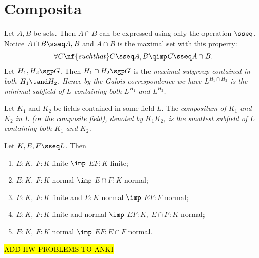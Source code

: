 \documentclass[a4paper]{article}
\begin{document}
\section{Composita}
\begin{tremark}
  Let \( A,B \) be sets. Then \( A\cap B \) can be expressed using only the operation \( \sseq \).
  Notice \( A\cap B \sseq A,B \) and \( A\cap B \) is the maximal set with this property: \begin{align*}
    \forall C \nf{ such that } C\sseq A,B \qimp C\sseq A\cap B.
  \end{align*}
  Let \( H_1,H_2\sgp G \).
  Then \( H_1\cap H_2 \sgp G \) is the \it{maximal} subgroup contained in both \( H_1 \tand H_2 \).
  Hence by the Galois correspondence we have \( L^{H_1\cap H_2} \) is the \it{minimal} subfield of \( L \) containing both \( L^{H_1} \) and \( L^{H_2} \).
\end{tremark}

\begin{tdefinition}[Compositum]
  Let \( K_1 \) and \( K_2 \) be fields contained in some field \( L \).
  The \it{compositum} of \( K_1 \) and \( K_2 \) in \( L \) (or the \it{composite field}), denoted by \( K_1K_2 \), is the smallest subfield of \( L \) containing both \( K_1 \) and \( K_2 \).
\end{tdefinition}

\begin{tlemma}
  Let \( K,E,F \sseq L \).
  Then \begin{enumerate}
    \item \( E:K,\ F:K \) finite \( \imp \) \( EF:K \) finite;
    \item \( E:K,\ F:K \) normal \( \imp \) \( E\cap F:K \) normal;
    \item \( E:K,\ F:K \) finite and \( E:K \) normal \( \imp \) \( EF:F \) normal;
    \item \( E:K,\ F:K \) finite and normal \( \imp \) \( EF:K,\ E\cap F:K \) normal;
    \item \( E:K,\ F:K \) normal \( \imp \) \( EF:E\cap F \) normal.
  \end{enumerate}
  \hl{ADD HW PROBLEMS TO ANKI}
\end{tlemma}
\end{document}

